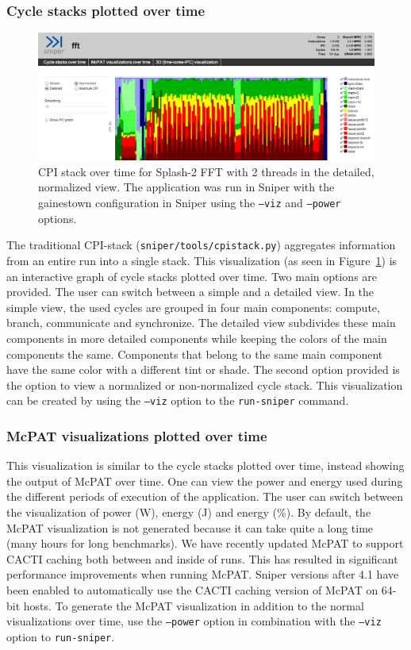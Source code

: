\documentclass[a4paper,11pt,titlepage]{article}
\newcommand{\cmd}[1]{{\tt #1}}
\begin{document}
\subsubsection{Cycle stacks plotted over time}

\begin{figure}\centering
  \includegraphics[width=1.0\linewidth]{fft-2-level2.png}
  \caption{
    \label{fig:fft-level2}
    CPI stack over time for Splash-2 FFT with 2 threads in the detailed, normalized view. The application was run in Sniper with the gainestown configuration in Sniper using the \cmd{--viz} and \cmd{--power} options.
}\end{figure}

The traditional CPI-stack (\cmd{sniper/tools/cpistack.py}) aggregates information from an entire run into a single stack.
This visualization (as seen in Figure~\ref{fig:fft-level2})
is an interactive graph of cycle stacks plotted over time. Two main options are provided.
The user can switch between a simple and a detailed view. In the simple view, the used cycles are grouped
in four main components: compute, branch, communicate and synchronize. The detailed view subdivides these
main components in more detailed components while keeping the colors of the main components the same. Components
that belong to the same main component have the same color with a different tint or shade. The second option provided
is the option to view a normalized or non-normalized cycle stack.
This visualization can be created by using the \cmd{--viz} option to the \cmd{run-sniper} command.

\subsubsection{McPAT visualizations plotted over time}
This visualization is similar to the cycle stacks plotted over time, instead showing the output
of McPAT over time. One can view the power and energy used during the different periods of execution of
the application. The user can switch between the visualization of power (W), energy (J) and energy (\%).
By default, the McPAT visualization is not generated because it can take quite a long time (many hours for long benchmarks).
We have recently updated McPAT to support CACTI caching both between and inside of runs. This has resulted in significant
performance improvements when running McPAT. Sniper versions after 4.1 have been enabled to automatically use the CACTI caching version
of McPAT on 64-bit hosts.
To generate the McPAT visualization in addition to the normal visualizations over time,
use the \cmd{--power} option in combination with the \cmd{--viz} option to \cmd{run-sniper}.
\end{document}
